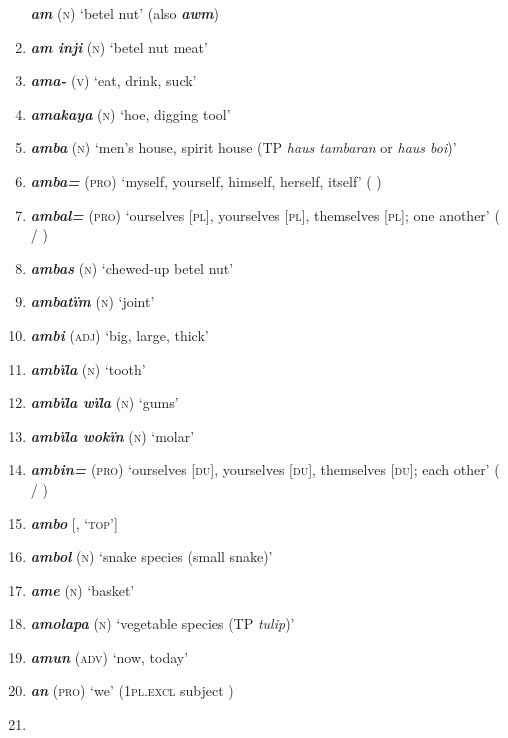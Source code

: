\begin{enumerate}[noitemsep, label={}, align=left, widest=190, labelsep=1ex,leftmargin=*,itemindent=-10pt]
\textbf{\textit{am}} (\textsc{n)} ‘betel nut’ (also \textbf{\textit{awm}}) \item 
\textbf{\textit{am inji}} (\textsc{n)} ‘betel nut meat’ \item
\textbf{\textit{ama-}} (\textsc{v)} ‘eat, drink, suck’ \item
\textbf{\textit{amakaya}} (\textsc{n)} ‘hoe, digging tool’ \item
\textbf{\textit{amba}} (\textsc{n)} ‘men’s house, spirit house (TP \textit{haus tambaran} or \textit{haus boi})’ \item
\textbf{\textit{amba=}} (\textsc{pro)} ‘myself, yourself, himself, herself, itself’ (  \linebreak {}) \item
\textbf{\textit{ambal=}} (\textsc{pro)} ‘ourselves [\textsc{pl}], yourselves [\textsc{pl}], themselves [\textsc{pl}]; one another’ \linebreak( / )  \item
\textbf{\textit{ambas}} (\textsc{n)} ‘chewed-up betel nut’ \item
\textbf{\textit{ambatïm}} (\textsc{n)} ‘joint’ \item
\textbf{\textit{ambi}} (\textsc{adj)} ‘big, large, thick’ \item
\textbf{\textit{ambïla}} (\textsc{n)} ‘tooth’ \item
\textbf{\textit{ambïla wïla}} (\textsc{n)} ‘gums’ \item
\textbf{\textit{ambïla wokïn}} (\textsc{n)} ‘molar’  \item
\textbf{\textit{ambin=}} (\textsc{pro)} ‘ourselves [\textsc{du}], yourselves [\textsc{du}], themselves [\textsc{du}]; each other’ \linebreak( / )  \item
\textbf{\textit{ambo}} [, ‘\textsc{top’}] \item
\textbf{\textit{ambol}} (\textsc{n)} ‘snake species (small snake)’ \item
\textbf{\textit{ame}} (\textsc{n)} ‘basket’ \item
\textbf{\textit{amolapa}} (\textsc{n)} ‘vegetable species (TP \textit{tulip})’ \item
\textbf{\textit{amun}} (\textsc{adv)} ‘now, today’ \item
\textbf{\textit{an}} (\textsc{pro)} ‘we’ (1\textsc{pl.excl} subject ) \item

\end{enumerate}
